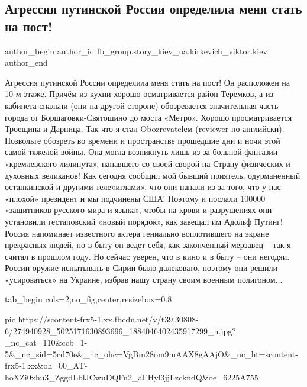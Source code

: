  
 
 
 
 
 
\subsection{Агрессия путинской России определила меня стать на пост!}
\label{sec:28_02_2022.fb.fb_group.story_kiev_ua.1.post}
 
\ifcmt
 author_begin
   author_id fb_group.story_kiev_ua,kirkevich_viktor.kiev
 author_end
\fi

Агрессия путинской России определила меня стать на пост! Он расположен на 10-м
этаже. Причём из кухни хорошо осматривается район Теремков, а из
кабинета-спальни (они на другой стороне) обозревается значительная часть города
от Борщаговки-Святошино до моста «Метро». Хорошо просматривается Троещина и
Дарница. Так что я стал Obozrevatelем (reviewer по-английски). Позвольте
обозреть во времени и пространстве прошедшие дни и ночи этой самой тяжелой
войны. Она могла возникнуть лишь из-за больной фантазии «кремлевского
лилипута», напавшего со своей сворой на Страну физических и духовных великанов!
Как сегодня сообщил мой бывший приятель, одурманенный останкинской и другими
теле«иглами», что они напали из-за того, что у нас «плохой» президент и мы
подчинены США! Поэтому и послали 100000 «защитников русского мира и языка»,
чтобы на крови и разрушениях они установили гестаповский «новый порядок», как
завещал им Адольф Путинг! Россия напоминает известного актера гениально
воплотившего на экране прекрасных людей, но в быту он ведет себя, как
законченный мерзавец – так я считал в прошлом году. Но сейчас уверен, что в
кино и в быту – они негодяи.  России оружие испытывать в Сирии было далековато,
поэтому они решили «усироваться» на Украине, избрав нашу страну своим военным
полигоном...

\ifcmt
  tab_begin cols=2,no_fig,center,resizebox=0.8

     pic https://scontent-frx5-1.xx.fbcdn.net/v/t39.30808-6/274940928_5025171630893696_1884046402435917299_n.jpg?_nc_cat=110&ccb=1-5&_nc_sid=5cd70e&_nc_ohc=VgBm28om9mAAX8gAAjO&_nc_ht=scontent-frx5-1.xx&oh=00_AT-hoXZi0xhu3_ZggdLblJCwuDQFn2_aFHyl3jjLzckndQ&oe=6225A755

